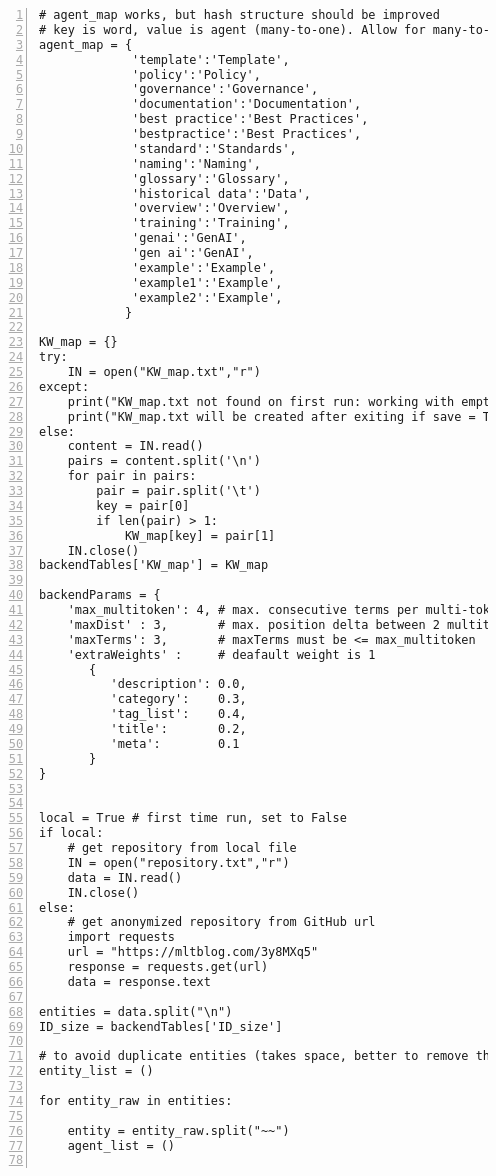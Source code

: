 \documentclass[10pt]{article}
\begin{document}
{\begin{lstlisting}[numbers=left,basicstyle=\ttfamily\footnotesize]
# agent_map works, but hash structure should be improved
# key is word, value is agent (many-to-one). Allow for many-to-many
agent_map = {  
             'template':'Template',
             'policy':'Policy',
             'governance':'Governance',
             'documentation':'Documentation',
             'best practice':'Best Practices',
             'bestpractice':'Best Practices',
             'standard':'Standards',
             'naming':'Naming',
             'glossary':'Glossary',
             'historical data':'Data',
             'overview':'Overview',
             'training':'Training',
             'genai':'GenAI',
             'gen ai':'GenAI',
             'example':'Example',
             'example1':'Example',
             'example2':'Example',
            }

KW_map = {}
try:
    IN = open("KW_map.txt","r")
except:
    print("KW_map.txt not found on first run: working with empty KW_map.")
    print("KW_map.txt will be created after exiting if save = True.")
else: 
    content = IN.read()
    pairs = content.split('\n')
    for pair in pairs: 
        pair = pair.split('\t')
        key = pair[0]
        if len(pair) > 1:
            KW_map[key] = pair[1] 
    IN.close()
backendTables['KW_map'] = KW_map 

backendParams = {
    'max_multitoken': 4, # max. consecutive terms per multi-token for inclusion in dictionary
    'maxDist' : 3,       # max. position delta between 2 multitokens to link them in hash_pairs
    'maxTerms': 3,       # maxTerms must be <= max_multitoken
    'extraWeights' :     # deafault weight is 1
       {
          'description': 0.0,
          'category':    0.3,
          'tag_list':    0.4,
          'title':       0.2,
          'meta':        0.1
       }
}


local = True # first time run, set to False
if local: 
    # get repository from local file
    IN = open("repository.txt","r") 
    data = IN.read()
    IN.close()
else:
    # get anonymized repository from GitHub url
    import requests
    url = "https://mltblog.com/3y8MXq5"
    response = requests.get(url)
    data = response.text

entities = data.split("\n")
ID_size = backendTables['ID_size']

# to avoid duplicate entities (takes space, better to remove them in the corpus)
entity_list = () 

for entity_raw in entities: 

    entity = entity_raw.split("~~")
    agent_list = ()
    

\end{lstlisting}}
\end{document}
